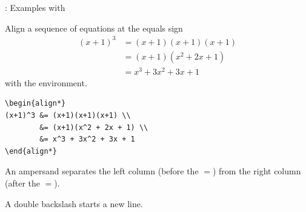 \begin{frame}[fragile]{\insertsubsection{}: Examples with }
\begin{itemize}{\small
\item Align a sequence of equations at the equals sign
\begin{align*}
(x+1)^3 &= (x+1)(x+1)(x+1) \\
        &= (x+1)(x^2 + 2x + 1) \\
        &= x^3 + 3x^2 + 3x + 1
\end{align*}
with the  environment.

\begin{verbatim}
\begin{align*}
(x+1)^3 &= (x+1)(x+1)(x+1) \\
        &= (x+1)(x^2 + 2x + 1) \\
        &= x^3 + 3x^2 + 3x + 1
\end{align*}
\end{verbatim}
\item An ampersand \keystrokebftt{\&} separates the left column (before the
$=$) from the right column (after the $=$).
\item A double backslash \keystrokebftt{\bs}\keystrokebftt{\bs} starts a new
line.
}\end{itemize}
\end{frame}


